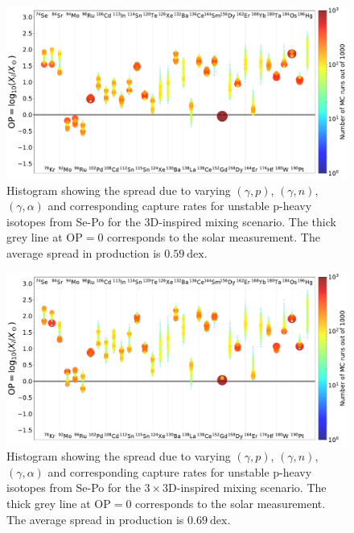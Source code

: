 \begin{figure}[!htbp]
\includegraphics[width=\textwidth]{chapters/2/figures/nuclearimpact_3D.pdf}
\caption{Histogram showing the spread due to varying $(\gamma,p)$, $(\gamma,n)$, $(\gamma,\alpha)$ and corresponding capture rates for unstable p-heavy isotopes from Se-Po for the 3D-inspired mixing scenario. The thick grey line at $\mathrm{OP} = 0$ corresponds to the solar measurement. The average spread in production is $0.59~\mathrm{dex}$.
\label{fig:nuclearimpact_3D}}
\end{figure}

\begin{figure}[!htbp]
\includegraphics[width=\textwidth]{chapters/2/figures/nuclearimpact_3x3D.pdf}
\caption{Histogram showing the spread due to varying $(\gamma,p)$, $(\gamma,n)$, $(\gamma,\alpha)$ and corresponding capture rates for unstable p-heavy isotopes from Se-Po for the $3\times$3D-inspired mixing scenario. The thick grey line at $\mathrm{OP} = 0$ corresponds to the solar measurement. The average spread in production is $0.69~\mathrm{dex}$.
\label{fig:nuclearimpact_3x3D}}
\end{figure}

